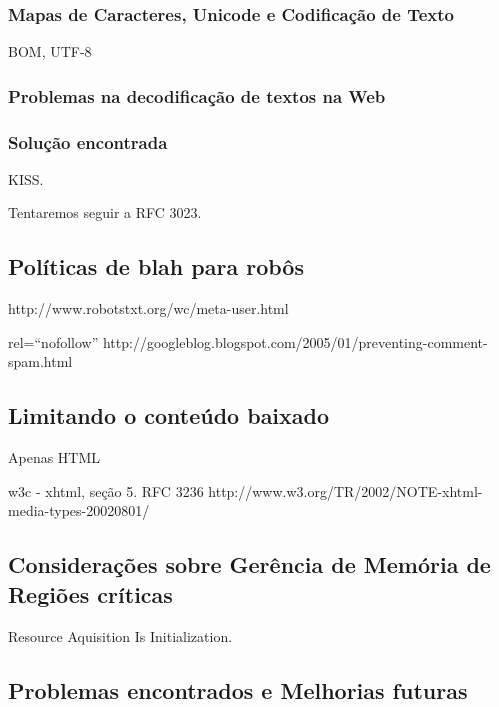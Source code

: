 \documentclass[10pt,twocolumn]{article}
\begin{document}
\subsubsection{Mapas de Caracteres, Unicode e Codificação de Texto}
BOM, UTF-8

\subsubsection{Problemas na decodificação de textos na Web}

\subsubsection{Solução encontrada}

KISS.

Tentaremos seguir a RFC 3023.
\subsection{Políticas de blah para robôs}
http://www.robotstxt.org/wc/meta-user.html

rel=``nofollow'' http://googleblog.blogspot.com/2005/01/preventing-comment-spam.html  



\subsection{Limitando o conteúdo baixado}

Apenas HTML 

w3c - xhtml, seção 5.
RFC 3236
http://www.w3.org/TR/2002/NOTE-xhtml-media-types-20020801/

\subsection{Considerações sobre Gerência de Memória de Regiões críticas}

Resource Aquisition Is Initialization.

\subsection{Problemas encontrados e Melhorias futuras}
\end{document}
